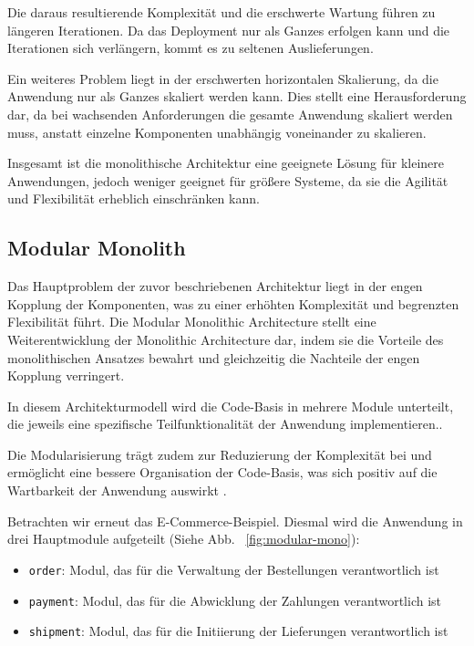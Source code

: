 \documentclass[acmtog]{acmart}
\begin{document}
Die daraus resultierende Komplexität und die erschwerte Wartung führen zu längeren
Iterationen.
Da das Deployment nur als Ganzes erfolgen kann und die Iterationen
sich verlängern, kommt es zu seltenen Auslieferungen.

Ein weiteres Problem liegt in der erschwerten horizontalen Skalierung, da die Anwendung
nur als Ganzes skaliert werden kann.
Dies stellt eine Herausforderung dar, da bei wachsenden
Anforderungen die gesamte Anwendung skaliert werden muss, anstatt einzelne Komponenten unabhängig
voneinander zu skalieren.

Insgesamt ist die monolithische Architektur eine geeignete Lösung für
kleinere Anwendungen, jedoch weniger geeignet für größere Systeme, da sie die Agilität und
Flexibilität erheblich einschränken kann.

\subsection{Modular Monolith}
Das Hauptproblem der zuvor beschriebenen Architektur liegt in der engen Kopplung der Komponenten,
was zu einer erhöhten Komplexität und begrenzten Flexibilität führt.
Die Modular Monolithic Architecture stellt eine Weiterentwicklung der Monolithic Architecture dar,
indem sie die Vorteile des monolithischen Ansatzes bewahrt und gleichzeitig die Nachteile
der engen Kopplung verringert.

In diesem Architekturmodell wird die Code-Basis in mehrere Module unterteilt, die jeweils
eine spezifische Teilfunktionalität der Anwendung implementieren.\cite[11]{modular-mono2}.

Die Modularisierung trägt zudem zur Reduzierung der Komplexität bei und ermöglicht eine bessere
Organisation der Code-Basis, was sich positiv auf die Wartbarkeit der Anwendung auswirkt \cite[23 - 24]{modular-mono4}.


Betrachten wir erneut das E-Commerce-Beispiel.
Diesmal wird die Anwendung in drei Hauptmodule aufgeteilt (Siehe Abb. ~\ref{fig:modular-mono}):
\begin{itemize}
  \item \texttt{order}: Modul, das für die Verwaltung der Bestellungen verantwortlich ist
  \item \texttt{payment}: Modul, das für die Abwicklung der Zahlungen verantwortlich ist
  \item \texttt{shipment}: Modul, das für die Initiierung der Lieferungen verantwortlich ist
\end{itemize}
\end{document}
